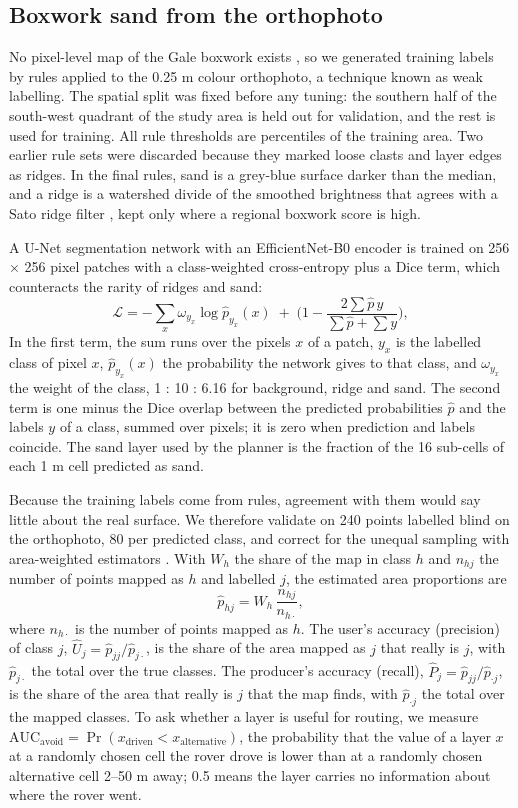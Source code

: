 \documentclass[11pt,a4paper]{article}
\begin{document}
\subsection{Boxwork sand from the orthophoto}

No pixel-level map of the Gale boxwork exists \cite{Siebach2014}, so we generated training labels by rules applied to the 0.25 m colour orthophoto, a technique known as weak labelling. The spatial split was fixed before any tuning: the southern half of the south-west quadrant of the study area is held out for validation, and the rest is used for training. All rule thresholds are percentiles of the training area. Two earlier rule sets were discarded because they marked loose clasts and layer edges as ridges. In the final rules, sand is a grey-blue surface darker than the median, and a ridge is a watershed divide of the smoothed brightness that agrees with a Sato ridge filter \cite{Sato1998}, kept only where a regional boxwork score is high.

A U-Net segmentation network with an EfficientNet-B0 encoder \cite{Ronneberger2015,Tan2019} is trained on 256 $\times$ 256 pixel patches with a class-weighted cross-entropy plus a Dice term, which counteracts the rarity of ridges and sand: \[\mathcal L = -\sum_x \omega_{y_x} \log \hat p_{y_x}(x) \;+\; \Big(1 - \frac{2\sum \hat p\, y}{\sum \hat p + \sum y}\Big),\] In the first term, the sum runs over the pixels $x$ of a patch, $y_x$ is the labelled class of pixel $x$, $\hat p_{y_x}(x)$ the probability the network gives to that class, and $\omega_{y_x}$ the weight of the class, 1 : 10 : 6.16 for background, ridge and sand. The second term is one minus the Dice overlap between the predicted probabilities $\hat p$ and the labels $y$ of a class, summed over pixels; it is zero when prediction and labels coincide. The sand layer used by the planner is the fraction of the 16 sub-cells of each 1 m cell predicted as sand.

Because the training labels come from rules, agreement with them would say little about the real surface. We therefore validate on 240 points labelled blind on the orthophoto, 80 per predicted class, and correct for the unequal sampling with area-weighted estimators \cite{Olofsson2014}. With $W_h$ the share of the map in class $h$ and $n_{hj}$ the number of points mapped as $h$ and labelled $j$, the estimated area proportions are \[\hat p_{hj} = W_h\,\frac{n_{hj}}{n_{h\cdot}},\] where $n_{h\cdot}$ is the number of points mapped as $h$. The user's accuracy (precision) of class $j$, $\hat U_j = \hat p_{jj}/\hat p_{j\cdot}$, is the share of the area mapped as $j$ that really is $j$, with $\hat p_{j\cdot}$ the total over the true classes. The producer's accuracy (recall), $\hat P_j = \hat p_{jj}/\hat p_{\cdot j}$, is the share of the area that really is $j$ that the map finds, with $\hat p_{\cdot j}$ the total over the mapped classes. To ask whether a layer is useful for routing, we measure $\text{AUC}_\text{avoid} = \Pr(x_\text{driven} < x_\text{alternative})$, the probability that the value of a layer $x$ at a randomly chosen cell the rover drove is lower than at a randomly chosen alternative cell 2--50 m away; 0.5 means the layer carries no information about where the rover went.
\end{document}
